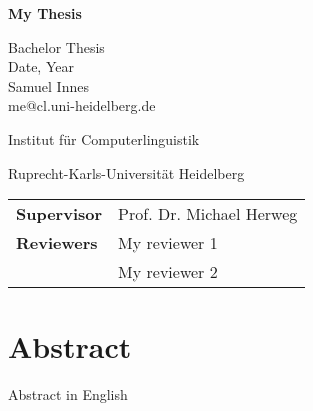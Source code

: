 
\sffamily
{} %
\pagestyle{empty}

\clearscrheadings\clearscrplain



\begin{center}

\begin{Huge}
\vspace{10mm}
\textbf{My Thesis}
\end{Huge}


\vspace{70mm}
\begin{large}
Bachelor Thesis\\
Date, Year\\

\vspace{1 cm}
Samuel Innes\\
me@cl.uni-heidelberg.de\\
\end{large}
\vspace{2cm}

\begin{Large}
Institut für Computerlinguistik\\ %
\vspace{3mm}
\end{Large}{\Large Ruprecht-Karls-Universität Heidelberg}\\ %
\vspace{2cm}

\begin{tabular}{ll}
\textbf{Supervisor} & Prof. Dr. Michael Herweg\\
\textbf{Reviewers} & My reviewer 1\\
 & My reviewer 2\\
\end{tabular}
\end{center}

\clearpage


\pagestyle{useheadings} %

\chapter*{Abstract}\label{c.abstract}
Abstract in English

